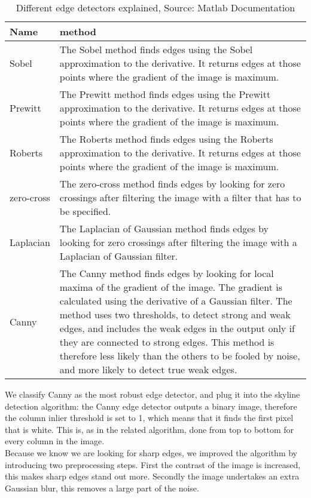 \begin{table}[ht]
\caption{Different edge detectors explained, Source: Matlab Documentation}
\label{tab:edge}
\begin{tabular}{|l|p{10cm}|}
	\hline
	Name & method\\
	\hline
	\hline
	Sobel					& The Sobel method finds edges using the Sobel
	approximation to the derivative. It returns edges at those points where the
	gradient of the image is maximum.\\
	\hline
	Prewitt					& The Prewitt method finds edges using the Prewitt
	approximation to the derivative. It returns edges at those points where the
	gradient of the image is maximum.\\
	\hline
	Roberts					& The Roberts method finds edges using the Roberts
	approximation to the derivative. It returns edges at those points where the
	gradient of the image is maximum.\\
	\hline
	zero-cross				& The zero-cross method finds edges by looking for zero
	crossings after filtering the image with a filter that has to be specified.\\
	\hline
	Laplacian				& The Laplacian of Gaussian method finds edges by
	looking for zero crossings after filtering the image with a Laplacian of Gaussian
	filter.\\
	\hline
	Canny					& The Canny method finds edges by looking for local
	maxima of the gradient of the image. The gradient is calculated using the derivative of
	a Gaussian filter. The method uses two thresholds, to detect strong and weak
	edges, and includes the weak edges in the output only if they are connected to
	strong edges. This method is therefore less likely than the others to be fooled
	by noise, and more likely to detect true weak edges.\\
	\hline
\end{tabular}
\end{table}
We classify Canny as the most robust edge detector, and plug it into the skyline detection
algorithm: the Canny edge detector outputs a binary image, therefore the column inlier
threshold is set to 1, which means that it finds the first pixel that is white. 
This is, as in the related algorithm, done from top to bottom for every column in
the image.\\
Because we know we are looking for sharp edges, we improved the algorithm by
introducing two preprocessing steps. First the contrast of the image is
increased, this makes sharp edges stand out more. Secondly the image undertakes
an extra Gaussian blur, this removes a large part of the noise. 

